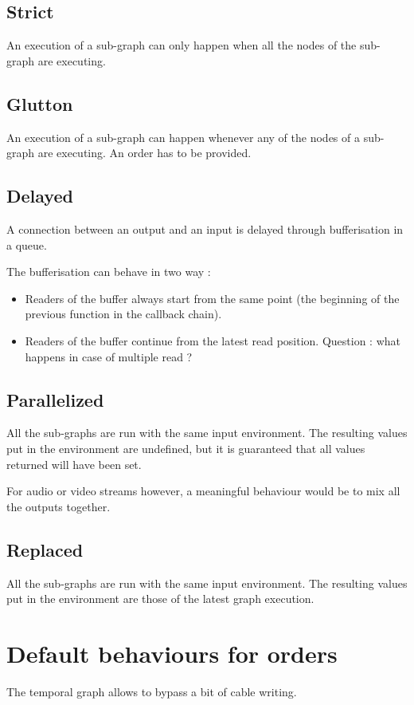 \documentclass[a4paper,twocolumns]{article}
\begin{document}
    \subsection{Strict}
    An execution of a sub-graph can only happen when all the nodes of the sub-graph are executing.
    
	\subsection{Glutton}
	An execution of a sub-graph can happen whenever any of the nodes of a sub-graph are executing. 
	An order has to be provided.
    
    
	\subsection{Delayed}
	A connection between an output and an input is delayed through bufferisation in a queue.
	
	The bufferisation can behave in two way :
	\begin{itemize}
		\item Readers of the buffer always start from the same point (the beginning of the previous function in the callback chain).
		\item Readers of the buffer continue from the latest read position.
		Question : what happens in case of multiple read ?
	\end{itemize}
	
	
	\subsection{Parallelized}
	All the sub-graphs are run with the same input environment. 
	The resulting values put in the environment are undefined, but it is guaranteed that all values returned will have been set.
	
    For audio or video streams however, a meaningful behaviour would be to mix all the outputs together.
     
	\subsection{Replaced}
	All the sub-graphs are run with the same input environment. 
	The resulting values put in the environment are those of the latest graph execution.
	
    \section{Default behaviours for orders}
    The temporal graph allows to bypass a bit of cable writing.
    
\end{document}
